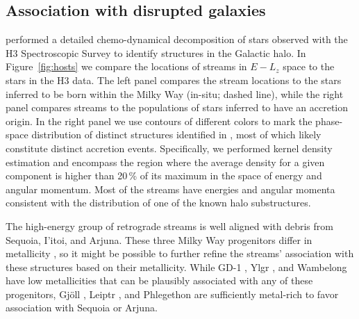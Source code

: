 \documentclass[twocolumn]{aastex63}
\newcommand{\feh}{\ensuremath{\textrm{[Fe/H]}}}
\begin{document}
\subsection{Association with disrupted galaxies}
\label{sec:hosts}

\citet{naidu2020} performed a detailed chemo-dynamical decomposition of stars observed with the H3 Spectroscopic Survey to identify structures in the Galactic halo.
In Figure~\ref{fig:hosts} we compare the locations of streams in $E-L_z$ space to the stars in the H3 data.
The left panel compares the stream locations to the stars inferred to be born within the Milky Way (in-situ; dashed line), while the right panel compares streams to the populations of stars inferred to have an accretion origin.
In the right panel we use contours of different colors to mark the phase-space distribution of distinct structures identified in \citet{naidu2020}, most of which likely constitute distinct accretion events.
Specifically, we performed kernel density estimation and encompass the region where the average density for a given component is higher than 20\,\% of its maximum in the space of energy and angular momentum.
Most of the streams have energies and angular momenta consistent with the distribution of one of the known halo substructures.

The high-energy group of retrograde streams is well aligned with debris from Sequoia, I'itoi, and Arjuna.
These three Milky Way progenitors differ in metallicity \citep{naidu2020}, so it might be possible to further refine the streams' association with these structures based on their metallicity.
While GD-1 \citep[spectroscopic $\feh=-2.3$,][]{bonaca2020b}, Ylgr \citep[spectroscopic $\feh=-1.9$,][]{ibata2019}, and  Wambelong \citep[isochrone $\feh=-2.2$,][]{shipp2018} have low metallicities that can be plausibly associated with any of these progenitors, Gj\" oll \citep[spectroscopic $\feh=-1.5$,][]{hansen2020}, Leiptr \citep[isochrone $\feh=-1.6$,][]{ibata2019}, and Phlegethon \citep[spectroscopic $\feh=-1.6$,][]{ibata2018} are sufficiently metal-rich to favor association with Sequoia or Arjuna.
\end{document}
